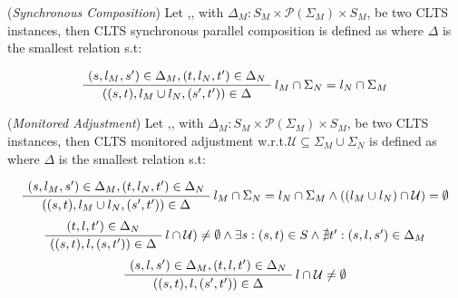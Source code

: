 \begin{definition} 
	\label{def:synchronous_composition}(\emph{Synchronous Composition}) Let ,, with $\Delta_M : S_M \times \mathcal{P}(\Sigma_M) \times S_M$, be two CLTS instances, then CLTS synchronous parallel composition is defined as  where $\Delta$ is the smallest relation s.t:
	\begin{center}
		\begin{equation}
		\AxiomC{$(s, l_M, s') \in \Delta_M,(t, l_N, t') \in \Delta_N  $}\RightLabel{$l_M \cap \Sigma_N = l_N \cap \Sigma_M$}
		\UnaryInfC{$((s,t),l_M \cup l_N,(s',t')) \in \Delta$}
		\DisplayProof	
		\end{equation}	
	\end{center}
\end{definition}

\begin{definition} 
	\label{def:monitored_adjustment}(\emph{Monitored Adjustment}) Let ,, with $\Delta_M : S_M \times \mathcal{P}(\Sigma_M) \times S_M$, be two CLTS instances, then CLTS monitored adjustment w.r.t.$\mathcal{U} \subseteq \Sigma_M \cup \Sigma_N$ is defined as  where $\Delta$ is the smallest relation s.t:
	\begin{center}
		\begin{equation}
		\AxiomC{$(s, l_M, s') \in \Delta_M,(t, l_N, t') \in \Delta_N  $}\RightLabel{$l_M \cap \Sigma_N = l_N \cap \Sigma_M \wedge ((l_M \cup l_N)\cap \mathcal{U}) = \emptyset$}
		\UnaryInfC{$((s,t),l_M \cup l_N,(s',t')) \in \Delta$}
		\DisplayProof	
		\end{equation}	
		\begin{equation}
		\AxiomC{$(t, l, t') \in \Delta_N  $}\RightLabel{$l \cap \mathcal{U}) \neq \emptyset \wedge \exists s:(s,t)\in S \wedge \nexists t':(s,l,s')\in \Delta_M$}
		\UnaryInfC{$((s,t),l,(s,t')) \in \Delta$}
		\DisplayProof	
		\end{equation}		
		\begin{equation}
		\AxiomC{$(s, l, s') \in \Delta_M,(t, l, t') \in \Delta_N  $}\RightLabel{$l \cap \mathcal{U} \neq \emptyset$}
		\UnaryInfC{$((s,t),l,(s',t')) \in \Delta$}
		\DisplayProof	
		\end{equation}			
	\end{center}
\end{definition}

